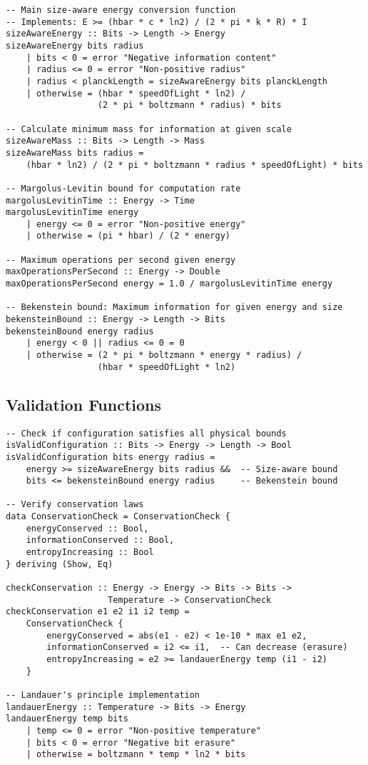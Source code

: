 \documentclass[11pt,a4paper]{article}
\theoremstyle{definition}
\begin{document}
\begin{lstlisting}
-- Main size-aware energy conversion function
-- Implements: E >= (hbar * c * ln2) / (2 * pi * k * R) * I
sizeAwareEnergy :: Bits -> Length -> Energy
sizeAwareEnergy bits radius 
    | bits < 0 = error "Negative information content"
    | radius <= 0 = error "Non-positive radius"
    | radius < planckLength = sizeAwareEnergy bits planckLength
    | otherwise = (hbar * speedOfLight * ln2) / 
                  (2 * pi * boltzmann * radius) * bits

-- Calculate minimum mass for information at given scale
sizeAwareMass :: Bits -> Length -> Mass
sizeAwareMass bits radius =
    (hbar * ln2) / (2 * pi * boltzmann * radius * speedOfLight) * bits

-- Margolus-Levitin bound for computation rate
margolusLevitinTime :: Energy -> Time
margolusLevitinTime energy 
    | energy <= 0 = error "Non-positive energy"
    | otherwise = (pi * hbar) / (2 * energy)

-- Maximum operations per second given energy
maxOperationsPerSecond :: Energy -> Double
maxOperationsPerSecond energy = 1.0 / margolusLevitinTime energy

-- Bekenstein bound: Maximum information for given energy and size
bekensteinBound :: Energy -> Length -> Bits
bekensteinBound energy radius
    | energy < 0 || radius <= 0 = 0
    | otherwise = (2 * pi * boltzmann * energy * radius) / 
                  (hbar * speedOfLight * ln2)
\end{lstlisting}

\subsection{Validation Functions}

\begin{lstlisting}
-- Check if configuration satisfies all physical bounds
isValidConfiguration :: Bits -> Energy -> Length -> Bool
isValidConfiguration bits energy radius =
    energy >= sizeAwareEnergy bits radius &&  -- Size-aware bound
    bits <= bekensteinBound energy radius     -- Bekenstein bound

-- Verify conservation laws
data ConservationCheck = ConservationCheck {
    energyConserved :: Bool,
    informationConserved :: Bool,
    entropyIncreasing :: Bool
} deriving (Show, Eq)

checkConservation :: Energy -> Energy -> Bits -> Bits -> 
                    Temperature -> ConservationCheck
checkConservation e1 e2 i1 i2 temp =
    ConservationCheck {
        energyConserved = abs(e1 - e2) < 1e-10 * max e1 e2,
        informationConserved = i2 <= i1,  -- Can decrease (erasure)
        entropyIncreasing = e2 >= landauerEnergy temp (i1 - i2)
    }

-- Landauer's principle implementation
landauerEnergy :: Temperature -> Bits -> Energy
landauerEnergy temp bits 
    | temp <= 0 = error "Non-positive temperature"
    | bits < 0 = error "Negative bit erasure"
    | otherwise = boltzmann * temp * ln2 * bits
\end{lstlisting}
\end{document}
